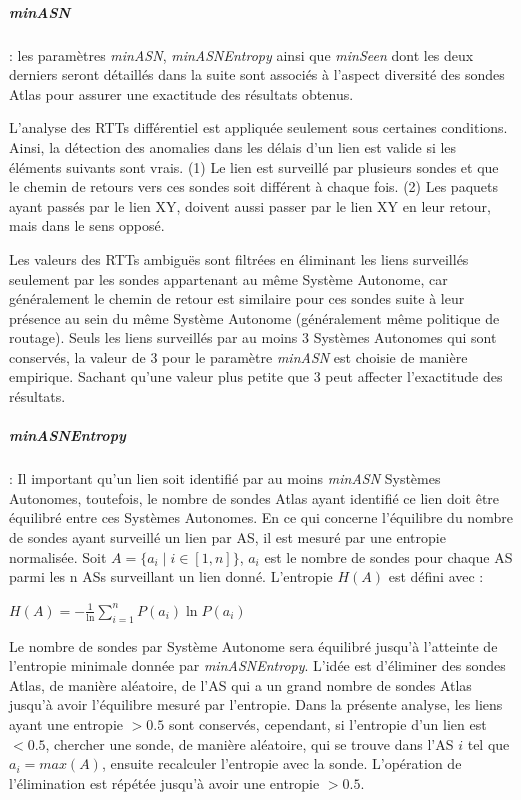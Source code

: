 \subparagraph{minASN} : les paramètres \textit{minASN}, \textit{minASNEntropy} ainsi que  \textit{minSeen} dont les deux derniers seront détaillés dans la suite sont associés à l'aspect diversité des sondes Atlas pour assurer une exactitude des résultats obtenus.


L'analyse des RTTs différentiel est appliquée seulement sous certaines conditions. Ainsi, la détection des anomalies dans les délais d'un lien est valide si les éléments suivants sont vrais. (1) Le lien est surveillé par plusieurs sondes et que le chemin de retours vers ces sondes soit différent à chaque fois. (2) Les paquets ayant passés par le lien XY, doivent aussi passer par le lien XY en leur retour, mais dans le sens opposé. 

Les valeurs des RTTs ambiguës sont filtrées en éliminant les liens surveillés seulement par les sondes appartenant au même Système Autonome, car généralement le chemin de retour est similaire pour ces sondes suite à leur présence au sein du même Système Autonome (généralement même politique de routage). Seuls les liens surveillés par au moins $3$ Systèmes Autonomes qui sont conservés, la valeur de $3$ pour le paramètre \textit{minASN} est choisie de manière empirique. Sachant qu'une valeur plus petite que $3$ peut affecter l'exactitude des résultats. 





\subparagraph{minASNEntropy} : Il important qu'un lien soit identifié par au moins \textit{minASN} Systèmes Autonomes, toutefois, le nombre de sondes Atlas ayant identifié ce lien doit être équilibré entre ces Systèmes Autonomes.  En ce qui concerne l'équilibre du nombre de sondes ayant surveillé un lien par AS, il est mesuré par une entropie normalisée. Soit $A = \{ a_i \mid i \in [1, n] \}$, $ a_i $ est le nombre de sondes pour chaque AS parmi les n ASs surveillant un lien donné. L'entropie $H(A)$ est défini avec :

\begin{center}
	$H(A) =  - \frac{1}{\ln} \sum_{i=1}^{n} P(a_i) \ln P(a_i) $
\end{center}

Le nombre de sondes par Système Autonome sera équilibré jusqu'à l'atteinte de l'entropie minimale donnée par \textit{minASNEntropy}. L'idée est d'éliminer des sondes Atlas, de manière aléatoire, de l'AS qui a un grand nombre de sondes Atlas jusqu'à avoir l'équilibre mesuré par l'entropie.     Dans la présente analyse, les liens ayant une entropie $> 0.5$ sont conservés, cependant, si  l'entropie d'un lien est $< 0.5$,  chercher une sonde, de manière aléatoire, qui se trouve dans l'AS $i$ tel que $a_i = max (A)$, ensuite recalculer l'entropie avec la sonde. L'opération de l'élimination est répétée jusqu'à avoir une entropie $ > 0.5 $.

